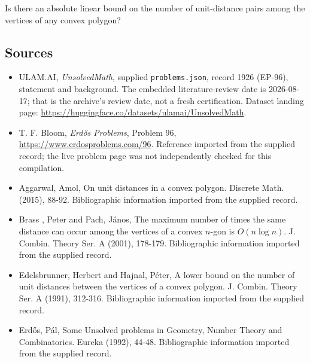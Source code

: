 \documentclass[11pt,a4paper]{article}
\begin{document}
Is there an absolute linear bound on the number of unit-distance pairs among the vertices of any convex polygon?

\subsection{Sources}

{\small

\begin{itemize}

\item[\hypertarget{source:1926:1}{S1}] ULAM.AI, \emph{UnsolvedMath}, supplied \texttt{problems.json}, record 1926 (EP-96), statement and background. The embedded literature-review date is 2026-08-17; that is the archive’s review date, not a fresh certification. Dataset landing page: \url{https://huggingface.co/datasets/ulamai/UnsolvedMath}.

\item[\hypertarget{source:1926:2}{S2}] T. F. Bloom, \emph{Erdős Problems}, Problem 96, \url{https://www.erdosproblems.com/96}. Reference imported from the supplied record; the live problem page was not independently checked for this compilation.

\item[\hypertarget{source:1926:3}{S3}] Aggarwal, Amol, On unit distances in a convex polygon. Discrete Math. (2015), 88-92. Bibliographic information imported from the supplied record.

\item[\hypertarget{source:1926:4}{S4}] Brass , Peter and Pach, J\'{a}nos, The maximum number of times the same distance can occur among the vertices of a convex {$n$}-gon is {$O(n\log n)$}. J. Combin. Theory Ser. A (2001), 178-179. Bibliographic information imported from the supplied record.

\item[\hypertarget{source:1926:5}{S5}] Edelsbrunner, Herbert and Hajnal, P\'{e}ter, A lower bound on the number of unit distances between the vertices of a convex polygon. J. Combin. Theory Ser. A (1991), 312-316. Bibliographic information imported from the supplied record.

\item[\hypertarget{source:1926:6}{S6}] Erd\H{o}s, P\'{a}l, Some Unsolved problems in Geometry, Number Theory and Combinatorics. Eureka (1992), 44-48. Bibliographic information imported from the supplied record.

\end{itemize}

}

\label{end:1926}
\end{document}
